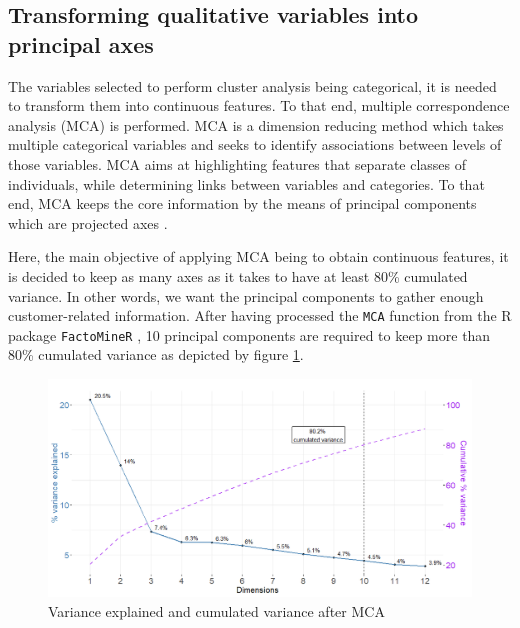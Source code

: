 \documentclass[
]{book}
\begin{document}
\hypertarget{transforming-qualitative-variables-into-principal-axes}{%
\subsection{Transforming qualitative variables into principal axes}\label{transforming-qualitative-variables-into-principal-axes}}

The variables selected to perform cluster analysis being categorical, it is needed to transform them into continuous features. To that end, multiple correspondence analysis (MCA) is performed. MCA is a dimension reducing method which takes multiple categorical variables and seeks to identify associations between levels of those variables. MCA aims at highlighting features that separate classes of individuals, while determining links between variables and categories. To that end, MCA keeps the core information by the means of principal components which are projected axes \citep{MCA}.

Here, the main objective of applying MCA being to obtain continuous features, it is decided to keep as many axes as it takes to have at least 80\% cumulated variance. In other words, we want the principal components to gather enough customer-related information. After having processed the \texttt{MCA} function from the R package \texttt{FactoMineR} \citep{FactoMineR2008}, 10 principal components are required to keep more than 80\% cumulated variance as depicted by figure \ref{fig:mcascreeplot}.

\begin{figure}

{\centering \includegraphics[width=15.14in]{./imgs/mca_screeplot} 

}

\caption{Variance explained and cumulated variance after MCA}\label{fig:mcascreeplot}
\end{figure}
\end{document}
